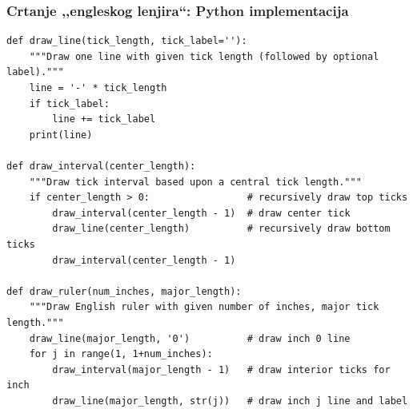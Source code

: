 \documentclass[compress]{beamer}
\begin{document}
\begin{frame}[fragile,shrink=10]
  \frametitle{Crtanje ,,engleskog lenjira``: Python implementacija}
\begin{verbatim}
def draw_line(tick_length, tick_label=''):
    """Draw one line with given tick length (followed by optional label)."""
    line = '-' * tick_length
    if tick_label:
        line += tick_label
    print(line)

def draw_interval(center_length):
    """Draw tick interval based upon a central tick length."""
    if center_length > 0:                 # recursively draw top ticks
        draw_interval(center_length - 1)  # draw center tick
        draw_line(center_length)          # recursively draw bottom ticks
        draw_interval(center_length - 1)

def draw_ruler(num_inches, major_length):
    """Draw English ruler with given number of inches, major tick length."""
    draw_line(major_length, '0')          # draw inch 0 line
    for j in range(1, 1+num_inches):
        draw_interval(major_length - 1)   # draw interior ticks for inch
        draw_line(major_length, str(j))   # draw inch j line and label
\end{verbatim}  
\end{frame}
\end{document}
